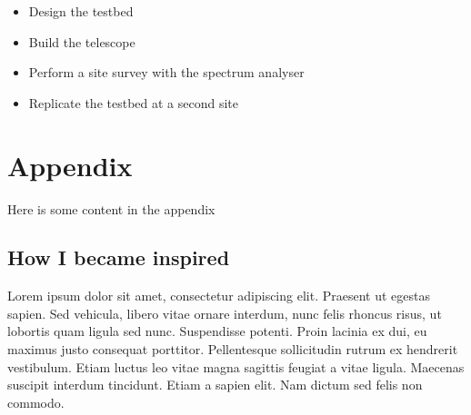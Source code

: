 \documentclass[runningheads,a4paper]{llncs}
\begin{document}
\begin{itemize}
  \item Design the testbed
  \item Build the telescope
  \item Perform a site survey with the spectrum analyser
  \item Replicate the testbed at a second site
\end{itemize}


%
\printglossaries
%
\newpage
\listoftables
{}
%


%
\newpage
%
\appendix
\section*{Appendix}
Here is some content in the appendix

\begin{subappendices}
\subsection*{How I became inspired}
Lorem ipsum dolor sit amet, consectetur adipiscing elit. Praesent ut egestas sapien. Sed vehicula, libero vitae ornare interdum, nunc felis rhoncus risus, ut lobortis quam ligula sed nunc. Suspendisse potenti. Proin lacinia ex dui, eu maximus justo consequat porttitor. Pellentesque sollicitudin rutrum ex hendrerit vestibulum. Etiam luctus leo vitae magna sagittis feugiat a vitae ligula. Maecenas suscipit interdum tincidunt. Etiam a sapien elit. Nam dictum sed felis non commodo.

%
\end{subappendices}
\end{document}
